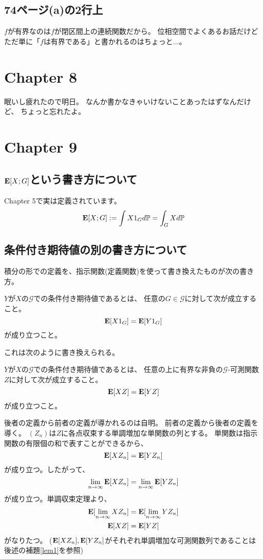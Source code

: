     \subsection{74ページ(a)の2行上}
      $f$が有界なのは$f$が閉区間上の連続関数だから。
      位相空間でよくあるお話だけどただ単に「$f$は有界である」と書かれるのはちょっと...。

  \section{Chapter 8}
    眠いし疲れたので明日。
    なんか書かなきゃいけないことあったはずなんだけど、
    ちょっと忘れたよ。

  \section{Chapter 9}
    \subsection{${\mathbf{E}}[X;G]$という書き方について}
      Chapter 5で実は定義されています。
      \[
        {\mathbf{E}}[X;G] := \int X 1_G d{\mathbb{P}} = \int_G X d{\mathbb{P}}
      \]

    \subsection{条件付き期待値の別の書き方について}
      積分の形での定義を、指示関数(定義関数)を使って書き換えたものが次の書き方。
      \begin{defn}
        $Y$が$X$の$\mathcal{G}$での条件付き期待値であるとは、
        任意の$G \in \mathcal{G}$に対して次が成立すること。
        \[
          {\mathbf{E}}[X1_G ] = {\mathbf{E}}[Y1_G]
        \]
        が成り立つこと。
      \end{defn}
      これは次のように書き換えられる。
      \begin{defn}
        $Y$が$X$の$\mathcal{G}$での条件付き期待値であるとは、
        任意の上に有界な非負の$\mathcal{G}$-可測関数$Z$に対して次が成立すること。
        \[
          {\mathbf{E}}[XZ] = {\mathbf{E}}[YZ]
        \]
        が成り立つこと。
      \end{defn}

      後者の定義から前者の定義が導かれるのは自明。
      前者の定義から後者の定義を導く。
      $(Z_n)$は$Z$に各点収束する単調増加な単関数の列とする。
      単関数は指示関数の有限個の和で表すことができるから、
      \[
        {\mathbf{E}}[XZ_n] = {\mathbf{E}}[YZ_n]
      \]
      が成り立つ。したがって、
      \[
        \lim_{n \to \infty} {\mathbf{E}}[XZ_n] = \lim_{n \to \infty} {\mathbf{E}}[YZ_n]
      \]
      が成り立つ。単調収束定理より、
      \begin{align*}
        {\mathbf{E}}[\lim_{n \to \infty} XZ_n] &= {\mathbf{E}}[\lim_{n \to \infty} YZ_n] \\
        {\mathbf{E}}[XZ] &= {\mathbf{E}}[YZ]
      \end{align*}
      がなりたつ。
      (${\mathbf{E}}[XZ_n],{\mathbf{E}}[YZ_n]$がそれぞれ単調増加な可測関数列であることは後述の補題\ref{lem1}を参照)

